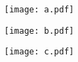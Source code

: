 

\hypersetup{
	pdftitle=
}

\title{}
\author{
	Martin Ueding \\
	\small{\href{mailto:mu@martin-ueding.de}{mu@martin-ueding.de}}
}

\pagestyle{empty}



\texttt{[image: a.pdf]}

\texttt{[image: b.pdf]}

\texttt{[image: c.pdf]}


%	
%	



